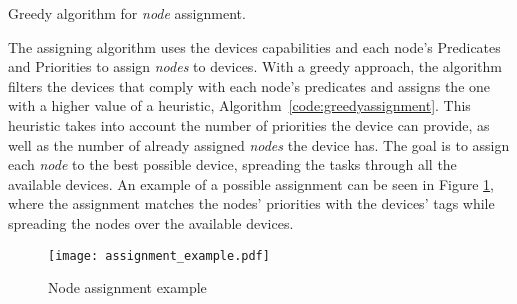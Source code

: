 \begin{algorithm}
\BlankLine
{}
\BlankLine
{}
\caption{Greedy algorithm for \textit{node} assignment.}
\label{code:greedyassignment}
\end{algorithm}

The assigning algorithm uses the devices capabilities and each node's Predicates and Priorities to assign \textit{nodes} to devices. With a greedy approach, the algorithm filters the devices that comply with each node's predicates and assigns the one with a higher value of a heuristic, \cf Algorithm~\ref{code:greedyassignment}. This heuristic takes into account the number of priorities the device can provide, as well as the number of already assigned \textit{nodes} the device has. The goal is to assign each \textit{node} to the best possible device, spreading the tasks through all the available devices. An example of a possible assignment can be seen in Figure \ref{fig:assigment_example}, where the assignment matches the nodes' priorities with the devices' tags while spreading the nodes over the available devices.

\begin{figure}[h]
\centering
\texttt{[image: assignment\_example.pdf]}
\caption[Node assignment example]{Node assignment example}\label{fig:assigment_example}
\end{figure}

